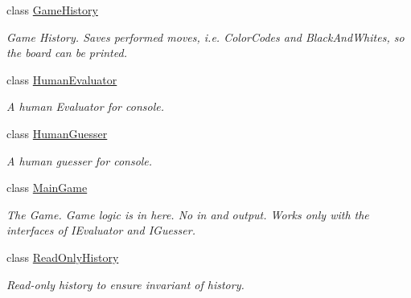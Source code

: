 \begin{DoxyCompactItemize}
class \hyperlink{classmastermind_1_1logic_1_1_game_history}{Game\+History}
\begin{DoxyCompactList}\small\item\em Game History. Saves performed moves, i.\+e. Color\+Codes and Black\+And\+Whites, so the board can be printed. \end{DoxyCompactList}\item 
class \hyperlink{classmastermind_1_1logic_1_1_human_evaluator}{Human\+Evaluator}
\begin{DoxyCompactList}\small\item\em A human Evaluator for console. \end{DoxyCompactList}\item 
class \hyperlink{classmastermind_1_1logic_1_1_human_guesser}{Human\+Guesser}
\begin{DoxyCompactList}\small\item\em A human guesser for console. \end{DoxyCompactList}\item 
class \hyperlink{classmastermind_1_1logic_1_1_main_game}{Main\+Game}
\begin{DoxyCompactList}\small\item\em The Game. Game logic is in here. No in and output. Works only with the interfaces of I\+Evaluator and I\+Guesser. \end{DoxyCompactList}\item 
class \hyperlink{classmastermind_1_1logic_1_1_read_only_history}{Read\+Only\+History}
\begin{DoxyCompactList}\small\item\em Read-\/only history to ensure invariant of history. \end{DoxyCompactList}\end{DoxyCompactItemize}
